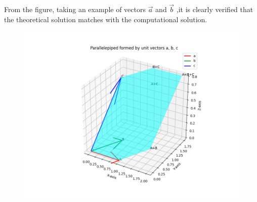 \documentclass[journal]{IEEEtran}
\begin{document}
From the figure, taking an example of vectors $\vec{a}$ and $\vec{b}$ ,it is clearly verified that the theoretical solution matches with the computational solution.\\
\newpage
\vspace*{0.25cm}
\begin{figure}[H]
    \centering
    \includegraphics[width=1.0\columnwidth]{figs/Figure-1.png}
    \label{fig:1}
\end{figure}
\end{document}
